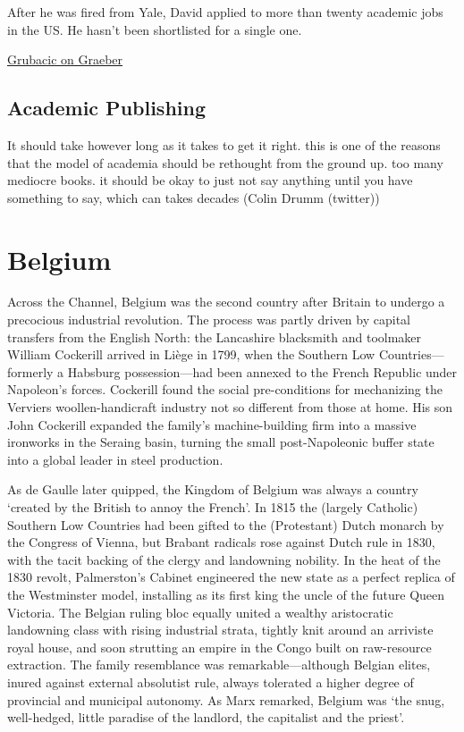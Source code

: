 \documentclass[
]{book}
\begin{document}
After he was fired from Yale, David applied to more than twenty academic jobs in the US. He hasn't been shortlisted for a single one.

\href{https://truthout.org/articles/david-graeber-left-us-a-parting-gift-his-thoughts-on-kropotkins-mutual-aid/}{Grubacic on Graeber}

\hypertarget{academic-publishing}{%
\section{Academic Publishing}\label{academic-publishing}}

It should take however long as it takes to get it right. this is one of the reasons that the model of academia should be rethought from the ground up. too many mediocre books. it should be okay to just not say anything until you have something to say, which can takes decades
(Colin Drumm (twitter))

\hypertarget{belgium}{%
\chapter{Belgium}\label{belgium}}

Across the Channel, Belgium was the second country after Britain to undergo a precocious industrial revolution. The process was partly driven by capital transfers from the English North: the Lancashire blacksmith and toolmaker William Cockerill arrived in Liège in 1799, when the Southern Low Countries---formerly a Habsburg possession---had been annexed to the French Republic under Napoleon's forces. Cockerill found the social pre-conditions for mechanizing the Verviers woollen-handicraft industry not so different from those at home. His son John Cockerill expanded the family's machine-building firm into a massive ironworks in the Seraing basin, turning the small post-Napoleonic buffer state into a global leader in steel production.

As de Gaulle later quipped, the Kingdom of Belgium was always a country `created by the British to annoy the French'. In 1815 the (largely Catholic) Southern Low Countries had been gifted to the (Protestant) Dutch monarch by the Congress of Vienna, but Brabant radicals rose against Dutch rule in 1830, with the tacit backing of the clergy and landowning nobility. In the heat of the 1830 revolt, Palmerston's Cabinet engineered the new state as a perfect replica of the Westminster model, installing as its first king the uncle of the future Queen Victoria. The Belgian ruling bloc equally united a wealthy aristocratic landowning class with rising industrial strata, tightly knit around an arriviste royal house, and soon strutting an empire in the Congo built on raw-resource extraction. The family resemblance was remarkable---although Belgian elites, inured against external absolutist rule, always tolerated a higher degree of provincial and municipal autonomy. As Marx remarked, Belgium was `the snug, well-hedged, little paradise of the landlord, the capitalist and the priest'.
\end{document}
